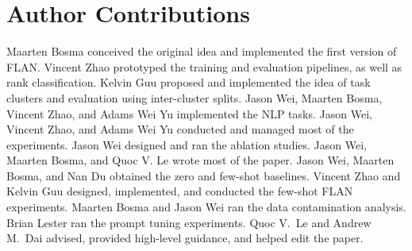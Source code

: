 \section*{Author Contributions}\label{sec:contributions}
Maarten Bosma conceived the original idea and implemented the first version of FLAN. Vincent Zhao prototyped the training and evaluation pipelines, as well as rank classification. Kelvin Guu proposed and implemented the idea of task clusters and evaluation using inter-cluster splits. Jason Wei, Maarten Bosma, Vincent Zhao, and Adams Wei Yu implemented the NLP tasks. Jason Wei, Vincent Zhao, and Adams Wei Yu conducted and managed most of the experiments. Jason Wei designed and ran the ablation studies. Jason Wei, Maarten Bosma, and Quoc V. Le wrote most of the paper. Jason Wei, Maarten Bosma, and Nan Du obtained the zero and few-shot baselines. Vincent Zhao and Kelvin Guu designed, implemented, and conducted the few-shot FLAN experiments. Maarten Bosma and Jason Wei ran the data contamination analysis. Brian Lester ran the prompt tuning experiments. Quoc V.~Le and Andrew M.~Dai advised, provided high-level guidance, and helped edit the paper.


